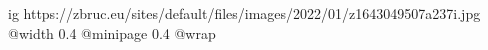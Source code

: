  
 
 
 
 

\ifcmt
  ig https://zbruc.eu/sites/default/files/images/2022/01/z1643049507a237i.jpg
  @width 0.4
  @minipage 0.4
  @wrap \parpic[r]
\fi
